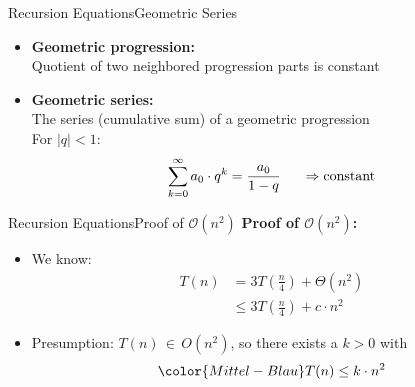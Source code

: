 \begin{frame}{Recursion Equations}{Geometric Series}
  \begin{itemize}
    \item
      \textbf{Geometric progression:}\\
      Quotient of two neighbored progression parts is constant
    \item
      \textbf{Geometric series:}\\
      The series (cumulative sum) of a geometric progression\\
      For $\mid q \mid < 1$:
      \begin{displaymath}
        \sum\limits^{\infty}_{k=0} a_0 \cdot q^k = \dfrac{a_0}{1 - q}
        \hspace{1.5em}\Rightarrow\text{constant}
      \end{displaymath}
  \end{itemize}
\end{frame}


\begin{frame}{Recursion Equations}{Proof of $\mathcal{O}(n^2)$}
  \textbf{Proof of $\mathcal{O}(n^2)$:}
  \begin{itemize}
    \item
      We know:
      \begin{align*}
        T(n) &= 3T\left(\frac{n}{4}\right) + \Theta(n^2)\\
        {} &\leq 3T \left(\frac{n}{4}\right) + c \cdot n^2
      \end{align*}
    \item
      Presumption:
      {\color{Mittel-Blau}$T(n) \, \in \, O(n^2)$},
      so there exists a {\color{Mittel-Blau}$k > 0$} with
      \begin{displaymath}
        \color{Mittel-Blau}
        T(n) \leq k \cdot n^2
      \end{displaymath}
  \end{itemize}
\end{frame}


